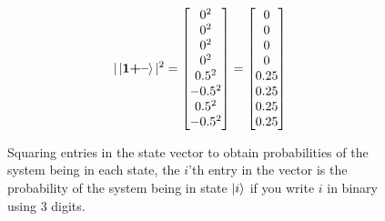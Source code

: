 \begin{figure}[H]
    \centering
    \begin{gather*}
        |\ket{\mathbf{1}\textbf{+}\textbf{--}}|^2=
        \begin{bmatrix}
            0^2\\
            0^2\\
            0^2\\
            0^2\\
            0.5^2\\
            -0.5^2\\
            0.5^2\\
            -0.5^2\\
        \end{bmatrix}
        =
        \begin{bmatrix}
            0\\
            0\\
            0\\
            0\\
            0.25\\
            0.25\\
            0.25\\
            0.25\\
        \end{bmatrix}
    \end{gather*}
    \caption{Squaring entries in the state vector to obtain probabilities of the system being in each state, the $i$'th entry in the vector is the probability of the system being in state $\ket{i}$ if you write $i$ in binary using 3 digits.}
    \label{fig:square_state}
\end{figure}

